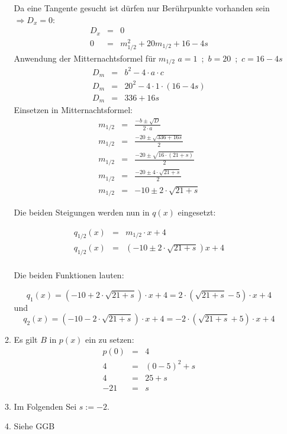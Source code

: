 \documentclass{scrartcl}
\begin{document}
\begin{enumerate}
\begin{enumerate}
				
				Da eine Tangente gesucht ist dürfen nur Berührpunkte vorhanden sein $\Rightarrow D_x = 0$:
				\begin{eqnarray}
					D_x &=& 0 \\
					0 &=& m_{1/2}^2+20m_{1/2}+16-4s   
				\end{eqnarray}
				Anwendung der Mitternachtsformel für $m_{1/2}$ $a=1$\ ;\ $b=20$\ ;\ $c= 16-4s$
				\begin{eqnarray}
					D_m &=& b^2 - 4 \cdot a \cdot c \\
					D_m &=& 20^2 - 4 \cdot 1 \cdot (16-4s) \\
					D_m &=& 336+16s \label{Ende_D_m}
				\end{eqnarray}
				Einsetzen in Mitternachtsformel:
				\begin{eqnarray}
					m_{1/2} &=& \frac{-b \pm \sqrt{D}}{2 \cdot a} \\
					m_{1/2} &=& \frac{-20 \pm \sqrt{336+16s}}{2} \\
					m_{1/2} &=& \frac{-20 \pm \sqrt{16\cdot (21+s)}}{2}\\
					m_{1/2} &=& \frac{-20 \pm 4 \cdot \sqrt{21+s}}{2}\\
					m_{1/2} &=& -10 \pm 2 \cdot \sqrt{21+s} 
				\end{eqnarray}
				
				Die beiden Steigungen werden nun in $q(x)$ eingesetzt:
				
				\begin{eqnarray}
					q_{1/2}(x) &=& m_{1/2} \cdot x+4 \\
					q_{1/2}(x) &=& (-10 \pm 2 \cdot \sqrt{21+s})x +4 \\
				\end{eqnarray}
				
				Die beiden Funktionen lauten:
				
				\begin{equation}
					q_{1}(x) = (-10 + 2 \cdot \sqrt{21+s}) \cdot x + 4  = 2 \cdot (\sqrt{21+s} - 5) \cdot x + 4 
				\end{equation}
				und
				\begin{equation}
					q_{2}(x) = (-10 - 2 \cdot \sqrt{21+s})\cdot x + 4  = -2 \cdot (\sqrt{21+s} + 5) \cdot x + 4 
				\end{equation}
				
				
			\item Es gilt $B$ in $p(x) $ ein zu setzen:
				\begin{eqnarray}
					p(0)&=&4 \\
					4 &=& (0-5)^2+s \\
					4 &=& 25 + s\\
					-21 &=& s
				\end{eqnarray}
			\item Im Folgenden Sei $s:=-2$.
			\item Siehe GGB


\end{enumerate}
\end{enumerate}
\end{document}
